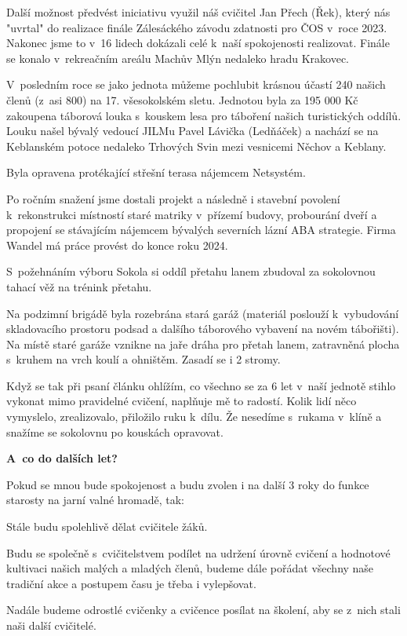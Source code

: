 \documentclass[11pt]{article}
\begin{document}
Další možnost předvést iniciativu využil náš cvičitel Jan Přech (Řek), který nás "uvrtal" do realizace finále Zálesáckého závodu zdatnosti pro ČOS v~roce 2023. Nakonec jsme to v~16 lidech dokázali celé k~naší spokojenosti realizovat. Finále se konalo v~rekreačním areálu Machův Mlýn nedaleko hradu Krakovec.

V~posledním roce se jako jednota můžeme pochlubit krásnou účastí 240 našich členů (z~asi 800) na 17. všesokolském sletu.
Jednotou byla za 195 000 Kč zakoupena táborová louka s~kouskem lesa pro táboření našich turistických oddílů. Louku našel bývalý vedoucí JILMu Pavel Lávička (Ledňáček) a nachází se na Keblanském potoce nedaleko Trhových Svin mezi vesnicemi Něchov a Keblany.

Byla opravena protékající střešní terasa nájemcem Netsystém.

Po ročním snažení jsme dostali projekt a následně i stavební povolení k~rekonstrukci místností staré matriky v~přízemí budovy, probourání dveří a propojení se stávajícím nájemcem bývalých severních lázní ABA strategie. Firma Wandel má práce provést do konce roku 2024.

S~požehnáním výboru Sokola si oddíl přetahu lanem zbudoval za sokolovnou tahací věž na trénink přetahu.

Na podzimní brigádě byla rozebrána stará garáž (materiál poslouží k~vybudování skladovacího prostoru podsad a dalšího táborového vybavení na novém tábořišti). Na místě staré garáže vznikne na jaře dráha pro přetah lanem, zatravněná plocha s~kruhem na vrch koulí a ohništěm. Zasadí se i 2 stromy.

Když se tak při psaní článku ohlížím, co všechno se za 6 let v~naší jednotě stihlo vykonat mimo pravidelné cvičení, naplňuje mě to radostí. Kolik lidí něco vymyslelo, zrealizovalo, přiložilo ruku k~dílu. Že nesedíme s~rukama v~klíně a snažíme se sokolovnu po kouskách opravovat.

\textbf{A~co do dalších let?}

Pokud se mnou bude spokojenost a budu zvolen i na další 3 roky do funkce starosty na jarní valné hromadě, tak:

Stále budu spolehlivě dělat cvičitele žáků.

Budu se společně s~cvičitelstvem podílet na udržení úrovně cvičení a hodnotové kultivaci našich malých a mladých členů, budeme dále pořádat všechny naše tradiční akce a postupem času je třeba i vylepšovat.

Nadále budeme odrostlé cvičenky a cvičence posílat na školení, aby se z~nich stali naši další cvičitelé.
\end{document}
